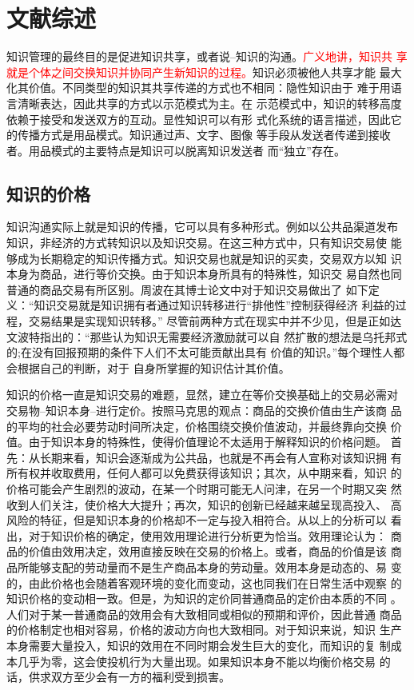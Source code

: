 \documentclass[12pt,a4paper]{ctexart}
\begin{document}
\section{文献综述}

知识管理的最终目的是促进知识共享，或者说--知识的沟通。\textcolor{red}{广义地讲，知识共
享就是个体之间交换知识并协同产生新知识的过程。}知识必须被他人共享才能
最大化其价值。不同类型的知识其共享传递的方式也不相同：隐性知识由于
难于用语言清晰表达，因此共享的方式以示范模式为主。在
示范模式中，知识的转移高度依赖于接受和发送双方的互动。\cite{zhoubo2006}显性知识可以有形
式化系统的语言描述，因此它的传播方式是用品模式。知识通过声、文字、图像
等手段从发送者传递到接收者。用品模式的主要特点是知识可以脱离知识发送者
而“独立”存在。\cite{zhoubo2006}

\subsection{知识的价格}

知识沟通实际上就是知识的传播，它可以具有多种形式。例如以公共品渠道发布
知识，非经济的方式转知识以及知识交易。在这三种方式中，只有知识交易使
能够成为长期稳定的知识传播方式。知识交易也就是知识的买卖，交易双方以知
识本身为商品，进行等价交换。由于知识本身所具有的特殊性，知识交
易自然也同普通的商品交易有所区别。周波在其博士论文中对于知识交易做出了
如下定义：“知识交易就是知识拥有者通过知识转移进行“排他性”控制获得经济
利益的过程，交易结果是实现知识转移。”\cite{zhoubo2006}
尽管前两种方式在现实中并不少见，但是正如达
文波特指出的：“那些认为知识无需要经济激励就可以自
然扩散的想法是乌托邦式的;在没有回报预期的条件下人们不太可能贡献出具有
价值的知识。”\cite{davenport1998wko}每个理性人都会根据自己的判断，对于
自身所掌握的知识估计其价值。

知识的价格一直是知识交易的难题，显然，建立在等价交换基础上的交易必需对
交易物--知识本身--进行定价。按照马克思的观点：商品的交换价值由生产该商
品的平均的社会必要劳动时间所决定，价格围绕交换价值波动，并最终靠向交换
价值。由于知识本身的特殊性，使得价值理论不太适用于解释知识的价格问题。
首先：从长期来看，知识会逐渐成为公共品，也就是不再会有人宣称对该知识拥
有所有权并收取费用，任何人都可以免费获得该知识；其次，从中期来看，知识
的价格可能会产生剧烈的波动，在某一个时期可能无人问津，在另一个时期又突
然收到人们关注，使价格大大提升；再次，知识的创新已经越来越呈现高投入、
高风险的特征，但是知识本身的价格却不一定与投入相符合。从以上的分析可以
看出，对于知识价格的确定，使用效用理论进行分析更为恰当。效用理论认为：
商品的价值由效用决定，效用直接反映在交易的价格上。或者，商品的价值是该
商品所能够支配的劳动量而不是生产商品本身的劳动量。效用本身是动态的、易
变的，由此价格也会随着客观环境的变化而变动，这也同我们在日常生活中观察
的知识价格的变动相一致。但是，为知识的定价同普通商品的定价由本质的不同
。人们对于某一普通商品的效用会有大致相同或相似的预期和评价，因此普通
商品的价格制定也相对容易，价格的波动方向也大致相同。对于知识来说，知识
生产本身需要大量投入，知识的效用在不同时期会发生巨大的变化，而知识的复
制成本几乎为零，这会使投机行为大量出现。如果知识本身不能以均衡价格交易
的话，供求双方至少会有一方的福利受到损害。
\end{document}
